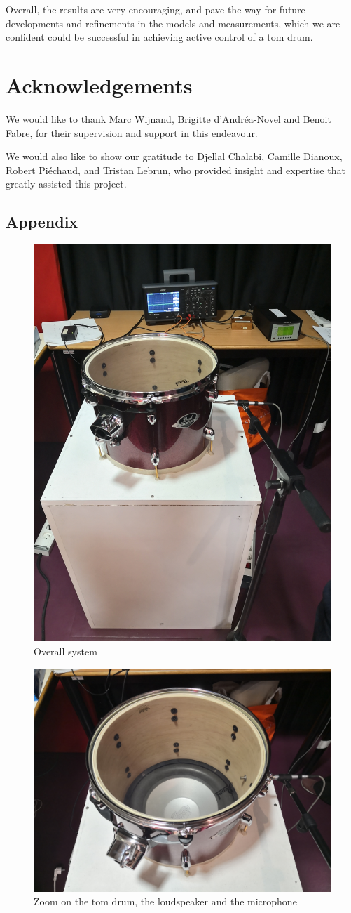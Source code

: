 \documentclass[11pt, twocolumn]{article}
\begin{document}
Overall, the results are very encouraging, and pave the way for future developments and refinements in the models and measurements, which we are confident could be successful in achieving active control of a tom drum.

\section*{Acknowledgements}
We would like to thank Marc Wijnand, Brigitte d'Andréa-Novel and Benoit Fabre, for their supervision and support in this endeavour.

We would also like to show our gratitude to Djellal Chalabi, Camille Dianoux, Robert Piéchaud, and Tristan Lebrun, who provided insight and expertise that greatly assisted this project.

{}

\newpage
\onecolumn
\begin{appendix}
\section*{Appendix}
\begin{figure}[H]
    \centering
    \includegraphics[width = 0.4\linewidth]{IMG_pic.jpg}
    \caption{Overall system}
\end{figure}

\begin{figure}[H]
    \centering
    \includegraphics[width = 0.4\linewidth]{IMG_pic2.jpg}
    \caption{Zoom on the tom drum, the loudspeaker and the microphone}
\end{figure}

\end{appendix}
\end{document}
